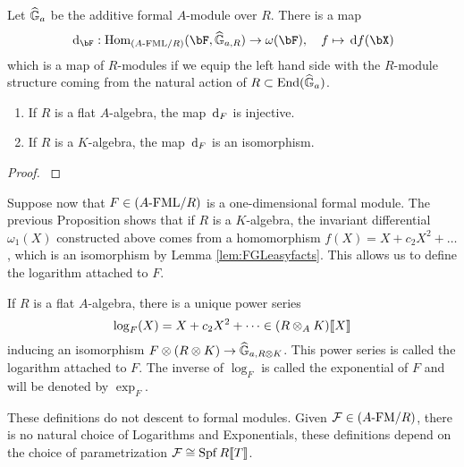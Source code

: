 \documentclass[../main.tex]{subfiles}
\begin{document}
Let $\widehat{\mathbb{G}}_a$ be the additive formal $A$-module over $R$. There is a map
\begin{equation} \label{eq:functorinvdifftohom}
  \dc_\bF : \Hom_{\FMLOver AR} (\bF, \GG_{a,R}) \to \omega(\bF), \quad f \mapsto \dc f(\bX)
\end{equation}
which is a map of $R$-modules if we equip the left hand side with the $R$-module
structure coming from the natural action of $R \subset \operatorname{End}(\widehat{\mathbb{G}}_a)$. 
\begin{prop}
  \begin{enumerate}
    \item If $R$ is a flat $A$-algebra, the map $\, \mathrm{d}_F$ is injective.
    \item If $R$ is a $K$-algebra, the map $\, \mathrm{d}_F$ is an isomorphism.
  \end{enumerate}
\begin{proof}
  \cite[Proposition 3.2]{hopkins1994equivariant} 
\end{proof}
\end{prop}

Suppose now that $F \in {({A}\text-\mathrm{FML}/{R})}$ is a one-dimensional formal module. 
The previous Proposition shows that if $R$ is a $K$-algebra, the invariant differential 
$\omega_1(X)$ constructed above comes from a homomorphism $f(X) = X + c_2 X^2 + \dots$,
which is an isomorphism by Lemma \ref{lem:FGLeasyfacts}. 
This allows us to define the logarithm attached to $F$.
\begin{defi}
  If $R$ is a flat $A$-algebra, there is a unique power series
  \begin{equation*}
    \log_F(X) = X + c_2 X^2 + \dots \in (R \otimes_A K)\llbracket X \rrbracket 
  \end{equation*}
  inducing an isomorphism $F \otimes (R \otimes K) \to \widehat{\mathbb{G}}_{a,R\otimes K}$.
  This power series is called the logarithm attached to $F$. 
  The inverse of $\log_F$ is called the exponential of $F$ and will be denoted by
  $\exp_F$.
\end{defi}
\begin{rmk} 
  These definitions do not descent to formal modules. Given $\mathcal{F} \in {({A}\text-\mathrm{FM}/{R})}$, there is no natural choice of Logarithms and Exponentials, these
  definitions depend on the choice of parametrization
  $\mathcal{F} \cong \operatorname{Spf} R \llbracket T \rrbracket$. 
\end{rmk}


\end{document}
